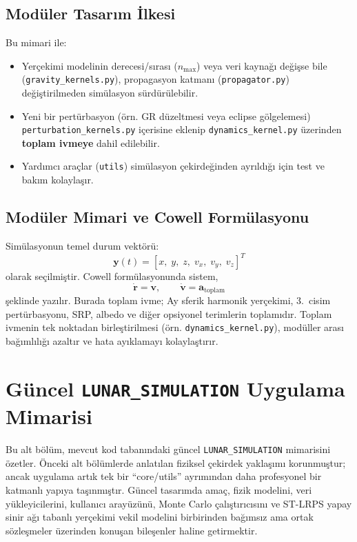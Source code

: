 \subsection{Modüler Tasarım İlkesi}
Bu mimari ile:
\begin{itemize}
    \item Yerçekimi modelinin derecesi/sırası (\(n_{\max}\)) veya veri kaynağı değişse bile (\texttt{gravity\_kernels.py}),
    propagasyon katmanı (\texttt{propagator.py}) değiştirilmeden simülasyon sürdürülebilir.
    \item Yeni bir pertürbasyon (örn. GR düzeltmesi veya eclipse gölgelemesi) \texttt{perturbation\_kernels.py} içerisine eklenip
    \texttt{dynamics\_kernel.py} üzerinden \textbf{toplam ivmeye} dahil edilebilir.
    \item Yardımcı araçlar (\texttt{utils}) simülasyon çekirdeğinden ayrıldığı için test ve bakım kolaylaşır.
\end{itemize}

\subsection{Modüler Mimari ve Cowell Formülasyonu}
Simülasyonun temel durum vektörü:
\[
\mathbf{y}(t) = [x,\;y,\;z,\;v_x,\;v_y,\;v_z]^T
\]
olarak seçilmiştir. Cowell formülasyonunda sistem,
\[
\dot{\mathbf{r}}=\mathbf{v}, \qquad \dot{\mathbf{v}}=\mathbf{a}_{\text{toplam}}
\]
şeklinde yazılır. Burada toplam ivme; Ay sferik harmonik yerçekimi, 3.\ cisim pertürbasyonu, SRP, albedo ve diğer opsiyonel terimlerin toplamıdır.
Toplam ivmenin tek noktadan birleştirilmesi (örn. \texttt{dynamics\_kernel.py}), modüller arası bağımlılığı azaltır ve hata ayıklamayı kolaylaştırır.


\newpage
\section{Güncel \texttt{LUNAR\_SIMULATION} Uygulama Mimarisi}
\label{sec:current_lunar_simulation_architecture}

Bu alt bölüm, mevcut kod tabanındaki güncel \texttt{LUNAR\_SIMULATION} mimarisini özetler. Önceki alt bölümlerde anlatılan fiziksel çekirdek yaklaşımı korunmuştur; ancak uygulama artık tek bir ``core/utils'' ayrımından daha profesyonel bir katmanlı yapıya taşınmıştır. Güncel tasarımda amaç, fizik modelini, veri yükleyicilerini, kullanıcı arayüzünü, Monte Carlo çalıştırıcısını ve ST-LRPS yapay sinir ağı tabanlı yerçekimi vekil modelini birbirinden bağımsız ama ortak sözleşmeler üzerinden konuşan bileşenler haline getirmektir.

